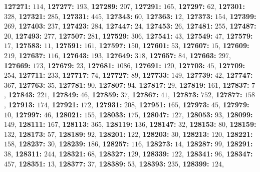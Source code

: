 \textsf{\bfseries 127271:} $114$, \textsf{\bfseries 127277:} $193$, \textsf{\bfseries 127289:} $207$, \textsf{\bfseries 127291:} $165$, \textsf{\bfseries 127297:} $62$, \textsf{\bfseries 127301:} $328$, \textsf{\bfseries 127321:} $285$, \textsf{\bfseries 127331:} $445$, \textsf{\bfseries 127343:} $60$, \textsf{\bfseries 127363:} $12$, \textsf{\bfseries 127373:} $154$, \textsf{\bfseries 127399:} $269$, \textsf{\bfseries 127403:} $237$, \textsf{\bfseries 127423:} $284$, \textsf{\bfseries 127447:} $24$, \textsf{\bfseries 127453:} $26$, \textsf{\bfseries 127481:} $255$, \textsf{\bfseries 127487:} $20$, \textsf{\bfseries 127493:} $277$, \textsf{\bfseries 127507:} $281$, \textsf{\bfseries 127529:} $306$, \textsf{\bfseries 127541:} $43$, \textsf{\bfseries 127549:} $47$, \textsf{\bfseries 127579:} $17$, \textsf{\bfseries 127583:} $11$, \textsf{\bfseries 127591:} $161$, \textsf{\bfseries 127597:} $150$, \textsf{\bfseries 127601:} $53$, \textsf{\bfseries 127607:} $15$, \textsf{\bfseries 127609:} $219$, \textsf{\bfseries 127637:} $116$, \textsf{\bfseries 127643:} $193$, \textsf{\bfseries 127649:} $318$, \textsf{\bfseries 127657:} $84$, \textsf{\bfseries 127663:} $297$, \textsf{\bfseries 127669:} $173$, \textsf{\bfseries 127679:} $23$, \textsf{\bfseries 127681:} $1086$, \textsf{\bfseries 127691:} $120$, \textsf{\bfseries 127703:} $45$, \textsf{\bfseries 127709:} $254$, \textsf{\bfseries 127711:} $233$, \textsf{\bfseries 127717:} $74$, \textsf{\bfseries 127727:} $89$, \textsf{\bfseries 127733:} $149$, \textsf{\bfseries 127739:} $42$, \textsf{\bfseries 127747:} $367$, \textsf{\bfseries 127763:} $35$, \textsf{\bfseries 127781:} $90$, \textsf{\bfseries 127807:} $94$, \textsf{\bfseries 127817:} $29$, \textsf{\bfseries 127819:} $161$, \textsf{\bfseries 127837:} $7$, \textsf{\bfseries 127843:} $221$, \textsf{\bfseries 127849:} $46$, \textsf{\bfseries 127859:} $37$, \textsf{\bfseries 127867:} $41$, \textsf{\bfseries 127873:} $752$, \textsf{\bfseries 127877:} $158$, \textsf{\bfseries 127913:} $174$, \textsf{\bfseries 127921:} $172$, \textsf{\bfseries 127931:} $208$, \textsf{\bfseries 127951:} $165$, \textsf{\bfseries 127973:} $45$, \textsf{\bfseries 127979:} $10$, \textsf{\bfseries 127997:} $46$, \textsf{\bfseries 128021:} $155$, \textsf{\bfseries 128033:} $175$, \textsf{\bfseries 128047:} $127$, \textsf{\bfseries 128053:} $93$, \textsf{\bfseries 128099:} $149$, \textsf{\bfseries 128111:} $167$, \textsf{\bfseries 128113:} $365$, \textsf{\bfseries 128119:} $136$, \textsf{\bfseries 128147:} $32$, \textsf{\bfseries 128153:} $80$, \textsf{\bfseries 128159:} $132$, \textsf{\bfseries 128173:} $57$, \textsf{\bfseries 128189:} $92$, \textsf{\bfseries 128201:} $122$, \textsf{\bfseries 128203:} $30$, \textsf{\bfseries 128213:} $120$, \textsf{\bfseries 128221:} $158$, \textsf{\bfseries 128237:} $30$, \textsf{\bfseries 128239:} $186$, \textsf{\bfseries 128257:} $116$, \textsf{\bfseries 128273:} $14$, \textsf{\bfseries 128287:} $99$, \textsf{\bfseries 128291:} $38$, \textsf{\bfseries 128311:} $244$, \textsf{\bfseries 128321:} $68$, \textsf{\bfseries 128327:} $129$, \textsf{\bfseries 128339:} $122$, \textsf{\bfseries 128341:} $96$, \textsf{\bfseries 128347:} $457$, \textsf{\bfseries 128351:} $13$, \textsf{\bfseries 128377:} $37$, \textsf{\bfseries 128389:} $53$, \textsf{\bfseries 128393:} $235$, \textsf{\bfseries 128399:} $124$, 
